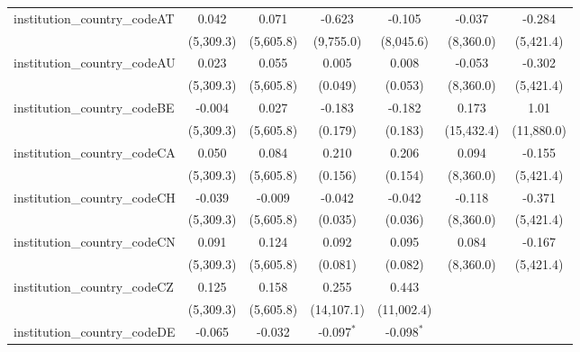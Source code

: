 \begin{tabular}{lcccccc}
   institution\_country\_codeAT          & 0.042         & 0.071         & -0.623         & -0.105         & -0.037         & -0.284\\   
                                         & (5,309.3)     & (5,605.8)     & (9,755.0)      & (8,045.6)      & (8,360.0)      & (5,421.4)\\   
   institution\_country\_codeAU          & 0.023         & 0.055         & 0.005          & 0.008          & -0.053         & -0.302\\   
                                         & (5,309.3)     & (5,605.8)     & (0.049)        & (0.053)        & (8,360.0)      & (5,421.4)\\   
   institution\_country\_codeBE          & -0.004        & 0.027         & -0.183         & -0.182         & 0.173          & 1.01\\   
                                         & (5,309.3)     & (5,605.8)     & (0.179)        & (0.183)        & (15,432.4)     & (11,880.0)\\   
   institution\_country\_codeCA          & 0.050         & 0.084         & 0.210          & 0.206          & 0.094          & -0.155\\   
                                         & (5,309.3)     & (5,605.8)     & (0.156)        & (0.154)        & (8,360.0)      & (5,421.4)\\   
   institution\_country\_codeCH          & -0.039        & -0.009        & -0.042         & -0.042         & -0.118         & -0.371\\   
                                         & (5,309.3)     & (5,605.8)     & (0.035)        & (0.036)        & (8,360.0)      & (5,421.4)\\   
   institution\_country\_codeCN          & 0.091         & 0.124         & 0.092          & 0.095          & 0.084          & -0.167\\   
                                         & (5,309.3)     & (5,605.8)     & (0.081)        & (0.082)        & (8,360.0)      & (5,421.4)\\   
   institution\_country\_codeCZ          & 0.125         & 0.158         & 0.255          & 0.443          &                &   \\   
                                         & (5,309.3)     & (5,605.8)     & (14,107.1)     & (11,002.4)     &                &   \\   
   institution\_country\_codeDE          & -0.065        & -0.032        & -0.097$^{*}$   & -0.098$^{*}$   &                &   \\   

\end{tabular}

